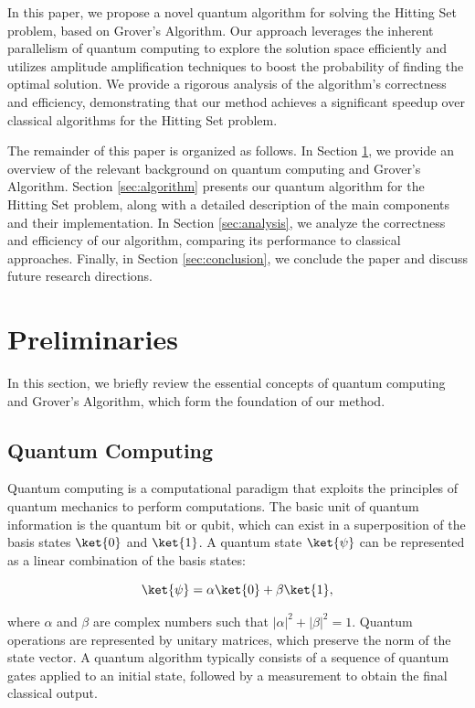 In this paper, we propose a novel quantum algorithm for solving the Hitting Set problem, based on Grover's Algorithm. Our approach leverages the inherent parallelism of quantum computing to explore the solution space efficiently and utilizes amplitude amplification techniques to boost the probability of finding the optimal solution. We provide a rigorous analysis of the algorithm's correctness and efficiency, demonstrating that our method achieves a significant speedup over classical algorithms for the Hitting Set problem.

The remainder of this paper is organized as follows. In Section \ref{sec:preliminaries}, we provide an overview of the relevant background on quantum computing and Grover's Algorithm. Section \ref{sec:algorithm} presents our quantum algorithm for the Hitting Set problem, along with a detailed description of the main components and their implementation. In Section \ref{sec:analysis}, we analyze the correctness and efficiency of our algorithm, comparing its performance to classical approaches. Finally, in Section \ref{sec:conclusion}, we conclude the paper and discuss future research directions.

\section{Preliminaries}
\label{sec:preliminaries}
In this section, we briefly review the essential concepts of quantum computing and Grover's Algorithm, which form the foundation of our method.

\subsection{Quantum Computing}
Quantum computing is a computational paradigm that exploits the principles of quantum mechanics to perform computations. The basic unit of quantum information is the quantum bit or qubit, which can exist in a superposition of the basis states $\ket{0}$ and $\ket{1}$. A quantum state $\ket{\psi}$ can be represented as a linear combination of the basis states:

\begin{equation}
\ket{\psi} = \alpha \ket{0} + \beta \ket{1},
\end{equation}

where $\alpha$ and $\beta$ are complex numbers such that $|\alpha|^2 + |\beta|^2 = 1$. Quantum operations are represented by unitary matrices, which preserve the norm of the state vector. A quantum algorithm typically consists of a sequence of quantum gates applied to an initial state, followed by a measurement to obtain the final classical output.

